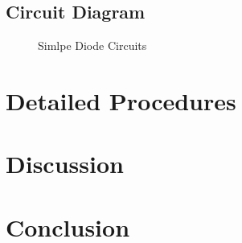 \newpage
    \subsection{Circuit Diagram}
    \begin{figure}[h]

        \begin{minipage}[h]{0.47\linewidth}
        \begin{center}
             
            \label{Lab1a}
            \end{center} 
        \end{minipage}
    \hfill
    \vspace{0.2 cm}
        \begin{minipage}[h]{0.47\linewidth}
        \begin{center}
             
            \label{Lab1b}
            \end{center}
        \end{minipage}
    \vfill
    \vspace{0.2 cm}
        \begin{minipage}[h]{0.47\linewidth}
        \begin{center}
             
            \label{Lab1c}
            \end{center}
        \end{minipage}
    \hfill
        \begin{minipage}[h]{0.47\linewidth}
        \begin{center}
             
            \label{Lab1d}
        \end{center}
        \end{minipage}
    \caption{Simlpe Diode Circuits}
    \label{SDC}

    \end{figure}
\FloatBarrier


\section{Detailed Procedures}


\section{Discussion}


\section{Conclusion}

